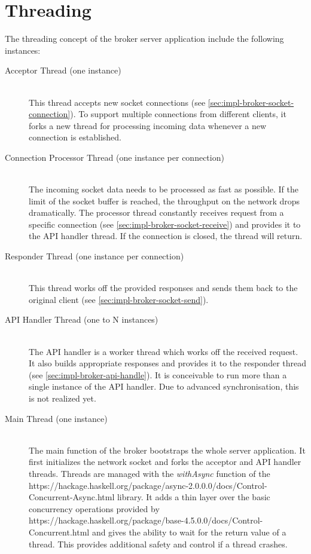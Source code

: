 \section{Threading}
\label{sec:impl-broker-threading}
The threading concept of the broker server application include the following
instances: 

\begin{description}
\item[Acceptor Thread (one instance)] \hfill \\
    This thread accepts new socket connections (see
    \ref{sec:impl-broker-socket-connection}). To support multiple connections from
    different clients, it forks a new thread for processing incoming data
    whenever a new connection is established. 

\item[Connection Processor Thread (one instance per connection)] \hfill \\
    The incoming socket data needs to be processed as fast as possible. If the
    limit of the socket buffer is reached, the throughput on the network drops
    dramatically. The processor thread constantly receives request
    from a specific connection (see \ref{sec:impl-broker-socket-receive}) and
    provides it to the API handler thread. If the connection is closed, the
    thread will return. 

\item[Responder Thread (one instance per connection)] \hfill \\
    This thread works off the provided responses and sends them back to the original
    client (see \ref{sec:impl-broker-socket-send}).  \item [API Handler Thread (one to N instances)] \hfill
    \\
    The API handler is a worker thread which works off the received request. It
    also builds appropriate responses and provides it to the responder thread
    (see \ref{sec:impl-broker-api-handle}). It is conceivable to run more than
    a single instance of the API handler. Due to advanced synchronisation, this is
    not realized yet.
\item [Main Thread (one instance)] \hfill \\
    The main function of the broker bootstraps the whole server application. It first
    initializes the network socket and forks the acceptor and API
    handler threads. Threads are managed with the \textit{withAsync} function of
    the 
    {https://hackage.haskell.org/package/async-2.0.0.0/docs/Control-Concurrent-Async.html}
    library. It adds a thin layer over the basic concurrency operations provided
    by 
    {https://hackage.haskell.org/package/base-4.5.0.0/docs/Control-Concurrent.html}
    and gives the ability to wait for the return value of a thread. This
    provides additional safety and control if a thread crashes. 
\end{description}

